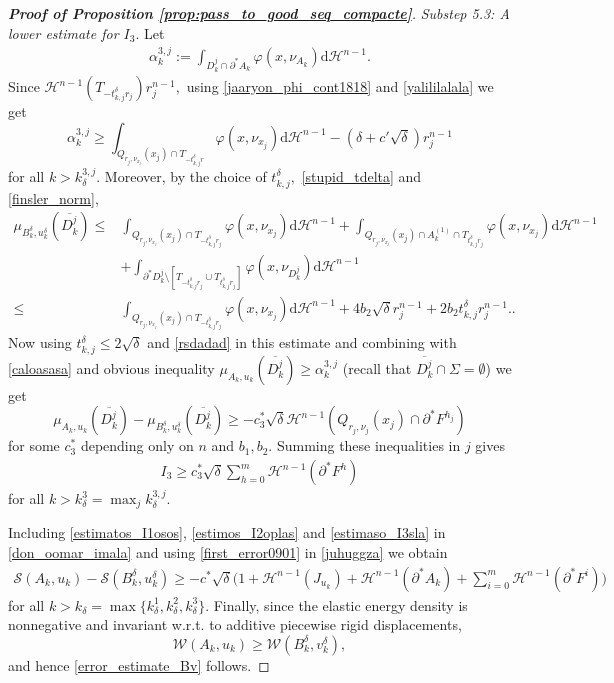 \documentclass[reqno]{amsart}
\numberwithin{equation}{section}
\theoremstyle{plain}
\theoremstyle{definition}
\newcommand{\cH}{\mathcal{H}}
\newcommand{\cS}{\mathcal{S}}
\newcommand{\cW}{\mathcal{W}}
\newcommand{\p}{\partial}
\newcommand{\cl}[1]{\overline{#1}}
\newcommand{\bound}{b}
\renewcommand{\d}{\mathrm{d}}
\begin{document}
\begin{proof}[\textbf{Proof of Proposition \ref{prop:pass_to_good_seq_compacte}}]
{\it Substep 5.3: A lower estimate for $I_3.$} Let
\begin{align*}
\alpha_k^{3,j}:= \int_{D_k^j\cap \p^*A_k} \varphi(x,\nu_{A_k})\d\cH^{n-1}.
\end{align*}
Since 
$\cH^{n-1}( T_{-t_{k,j}^\delta r_j}) r_j^{n-1},$ using \eqref{jaaryon_phi_cont1818} and \eqref{yalililalala} we get 
\begin{equation}\label{caloasasa}
\alpha_k^{3,j} \ge \int_{Q_{r_j,\nu_{x_j}}(x_j)\cap T_{-t_{k,j}^\delta r}} \varphi(x,\nu_{x_j})\d\cH^{n-1}
- (\delta + c'\sqrt{\delta})r_j^{n-1} 
\end{equation}
%
for all $k>k_\delta^{3,j}.$ 
Moreover, by the choice of $t_{k,j}^\delta,$ \eqref{stupid_tdelta} and \eqref{finsler_norm},
%
\begin{align*}
\mu_{B_k^\delta,u_k^\delta} (\cl{D_k^j}) \le & \int_{Q_{r_j,\nu_{x_j}}(x_j)\cap T_{-t_{k,j}^\delta r_j}} \varphi(x,\nu_{x_j})\d\cH^{n-1}
 +
\int_{Q_{r_j,\nu_{x_j}}(x_j)\cap A_k^{(1)}\cap T_{t_{k,j}^\delta r_j}} \varphi(x,\nu_{x_j})\d\cH^{n-1} \\
& +
\int_{\p^*D_k^j\setminus [T_{-t_{k,j}^\delta r_j}\cup T_{t_{k,j}^\delta r_j}]} \varphi(x,\nu_{D_k^j})\d\cH^{n-1}\\
\le & \int_{Q_{r_j,\nu_{x_j}}(x_j)\cap T_{-t_{k,j}^\delta r_j}} \varphi(x,\nu_{x_j})\d\cH^{n-1}
+ 4\bound_2\sqrt{\delta}r_j^{n-1} + 
2\bound_2t_{k,j}^\delta r_j^{n-1}.
.
\end{align*}
Now using $t_{k,j}^\delta \le 2\sqrt\delta$ and \eqref{rsdadad} in this estimate and combining with \eqref{caloasasa} and obvious inequality  $
\mu_{A_k,u_k}(\cl{D_k^j}) \ge \alpha_k^{3,j}
$ (recall that $\cl{D_k^j}\cap\Sigma=\emptyset$) we get 
$$
\mu_{A_k,u_k}(\cl{D_k^j})  - \mu_{B_k^\delta,u_k^\delta} (\cl{D_k^j}) \ge - c_3^*\sqrt{\delta}\cH^{n-1}( Q_{r_j,\nu_j}(x_j)\cap \p^*F^{h_j}) 
$$
for some $c_3^*$ depending only on $n$ and $\bound_1,\bound_2.$
Summing these inequalities in $j$ gives
\begin{align}\label{estimaso_I3sla}
I_3\ge c_3^*\sqrt{\delta}\sum\limits_{h=0}^m \cH^{n-1}(  \p^*F^h)
\end{align}
for all $k>k_\delta^3=\max_jk_\delta^{3,j}.$
%

Including \eqref{estimatos_I1osos}, \eqref{estimos_I2oplas} and \eqref{estimaso_I3sla} in \eqref{don_oomar_imala} and using \eqref{first_error0901} in \eqref{juhuggza} we obtain
\begin{align*}
\cS(A_k,u_k) - \cS(B_k^\delta,u_k^\delta) \ge 
-c^* \sqrt\delta \Big(1 + \cH^{n-1}(J_{u_k}) + \cH^{n-1}(\p^*A_k) + \sum\limits_{i=0}^m\cH^{n-1}(\p^*F^i) \Big)
\end{align*}
for all $k>k_\delta=\max\{k_\delta^1,k_\delta^2,k_\delta^3\}$. 
Finally, since the elastic energy density is nonnegative  and invariant w.r.t. to additive piecewise rigid displacements,
$$
\cW(A_k,u_k) \ge \cW(B_k^\delta,v_k^\delta),
$$
and hence \eqref{error_estimate_Bv} follows.
\end{proof}
\end{document}
